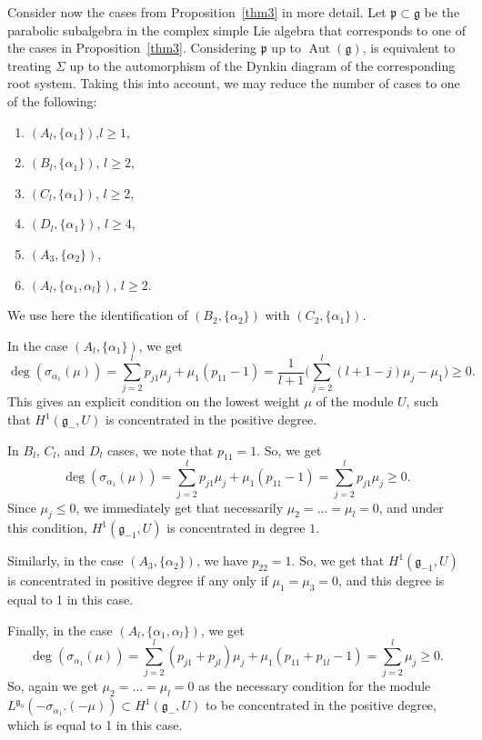 \documentclass[10pt,a4paper]{amsart}
\newcommand{\g}{\mathfrak g}
\newcommand{\pf}{\mathfrak p}
\newcommand{\Aut}{\operatorname{Aut}}
\numberwithin{equation}{section}
\begin{document}
Consider now the cases from Proposition~\ref{thm3} in more detail. Let $\pf\subset\g$ be the parabolic subalgebra in the complex simple Lie algebra that corresponds to one of the cases in Proposition~\ref{thm3}. Considering $\pf$ up to $\Aut(\g)$, is equivalent to treating $\Sigma$ up to the automorphism of the Dynkin diagram of the corresponding root system. Taking this into account, we may reduce the number of cases to one of the following:
\begin{enumerate}\itemsep=0pt
\item $(A_l,\{\alpha_1\})$,\quad $l\ge 1$,
\item $(B_l,\{\alpha_1\})$, \quad$l\ge 2$,
\item $(C_l,\{\alpha_1\})$, \quad$l\ge 2$,
\item $(D_l,\{\alpha_1\})$, \quad$l\ge 4$,
\item $(A_3,\{\alpha_2\})$,
\item $(A_l,\{\alpha_1,\alpha_l\})$, \quad$l\ge 2$.
\end{enumerate}
We use here the identification of $(B_2,\{\alpha_2\})$ with $(C_2,\{\alpha_1\})$.

In the case $(A_l,\{\alpha_1\})$, we get
\[
\deg(\sigma_{\alpha_1}(\mu))=
 \sum_{j=2}^l p_{j1}\mu_j + \mu_1(p_{11}-1) =
 \frac{1}{l+1}\bigg(\sum_{j=2}^l (l+1-j)\mu_j - \mu_1\bigg) \ge 0.
\]
This gives an explicit condition on the lowest weight $\mu$ of the module $U$, such that $H^1(\g_{-},U)$ is concentrated in the positive degree.

In $B_l$, $C_l$, and $D_l$ cases, we note that $p_{11}=1$. So, we get
\[
	\deg(\sigma_{\alpha_1}(\mu)) = \sum_{j=2}^l p_{j1}\mu_j + \mu_1(p_{11}-1)
	= \sum_{j=2}^l p_{j1}\mu_j \ge 0.
\]
Since $\mu_j\le 0$, we immediately get that necessarily $\mu_2=\dots=\mu_l=0$, and under this condition, $H^1(\g_{-1},U)$ is concentrated in degree $1$.

Similarly, in the case $(A_3,\{\alpha_2\})$, we have $p_{22}=1$. So, we get that $H^1(\g_{-1},U)$ is concentrated in positive degree if any only if $\mu_1=\mu_3=0$, and this degree is equal to 1 in this case.

Finally, in the case $(A_l,\{\alpha_1,\alpha_l\})$, we get
\[
	\deg(\sigma_{\alpha_1}(\mu)) =
	\sum_{j=2}^{l} (p_{j1}+p_{jl})\mu_j + \mu_1(p_{11}+p_{1l}-1)
	= \sum_{j=2}^{l} \mu_j \ge 0.
\]
So, again we get $\mu_2=\dots=\mu_l=0$ as the necessary condition for the module $L^{\g_0}(-\sigma_{\alpha_1}.(-\mu))\subset H^1(\g_{-},U)$ to be concentrated in the positive degree, which is equal to 1 in this case.
\end{document}
